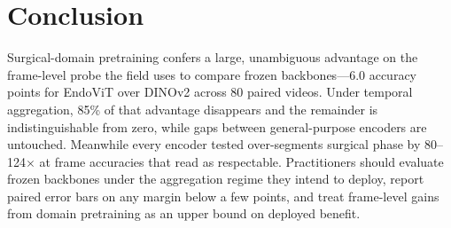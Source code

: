 \documentclass[10pt,twocolumn]{article}
\begin{document}
\section{Conclusion}
Surgical-domain pretraining confers a large, unambiguous advantage on the
frame-level probe the field uses to compare frozen backbones---6.0 accuracy
points for EndoViT over DINOv2 across 80 paired videos. Under temporal
aggregation, 85\% of that advantage disappears and the remainder is
indistinguishable from zero, while gaps between general-purpose encoders are
untouched. Meanwhile every encoder tested over-segments surgical phase by
80--124$\times$ at frame accuracies that read as respectable. Practitioners
should evaluate frozen backbones under the aggregation regime they intend to
deploy, report paired error bars on any margin below a few points, and treat
frame-level gains from domain pretraining as an upper bound on deployed
benefit.
\end{document}
